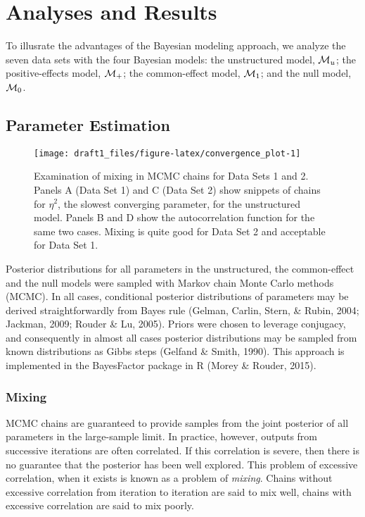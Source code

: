 \documentclass[american,man]{apa6}
\begin{document}
\section{Analyses and Results}\label{analyses-and-results}

To illusrate the advantages of the Bayesian modeling approach, we
analyze the seven data sets with the four Bayesian models: the
unstructured model, \({\cal M}_u\); the positive-effects model,
\({\cal M}_+\); the common-effect model, \({\cal M}_1\); and the null model,
\({\cal M}_0\).

\subsection{Parameter Estimation}\label{parameter-estimation}

\begin{figure}

{\centering \texttt{[image: draft1\_files/figure-latex/convergence\_plot-1]} 

}

\caption{Examination of mixing in MCMC chains for Data Sets 1 and 2. Panels A (Data Set 1) and C (Data Set 2) show snippets of chains for $\eta^2$, the slowest converging parameter, for the unstructured model. Panels B and D show the autocorrelation function for the same two cases. Mixing is quite good for Data Set 2 and acceptable for Data Set 1.}\label{fig:convergence_plot}
\end{figure}

Posterior distributions for all parameters in the unstructured, the
common-effect and the null models were sampled with Markov chain Monte
Carlo methods (MCMC). In all cases, conditional posterior distributions
of parameters may be derived straightforwardly from Bayes rule (Gelman,
Carlin, Stern, \& Rubin, 2004; Jackman, 2009; Rouder \& Lu, 2005).
Priors were chosen to leverage conjugacy, and consequently in almost all
cases posterior distributions may be sampled from known distributions as
Gibbs steps (Gelfand \& Smith, 1990). This approach is implemented in
the BayesFactor package in R (Morey \& Rouder, 2015).

\subsubsection{Mixing}\label{mixing}

MCMC chains are guaranteed to provide samples from the joint posterior
of all parameters in the large-sample limit. In practice, however,
outputs from successive iterations are often correlated. If this
correlation is severe, then there is no guarantee that the posterior has
been well explored. This problem of excessive correlation, when it
exists is known as a problem of \emph{mixing}. Chains without excessive
correlation from iteration to iteration are said to mix well, chains
with excessive correlation are said to mix poorly.
\end{document}
